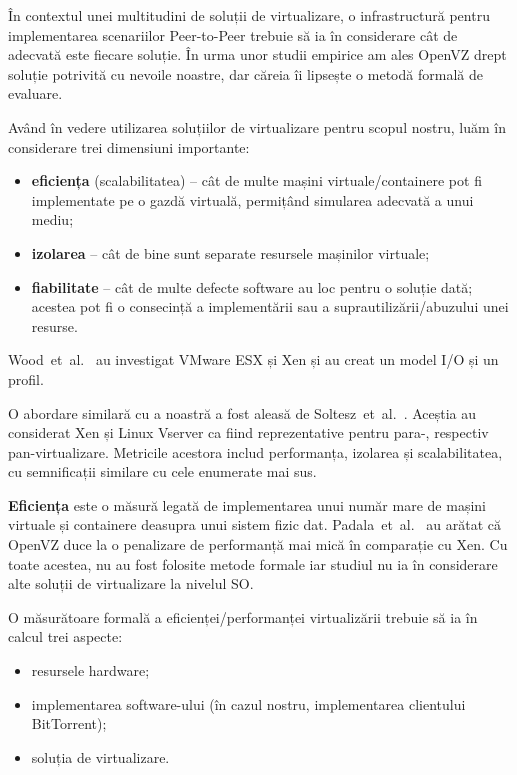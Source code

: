 În contextul unei multitudini de soluții de virtualizare, o infrastructură
pentru implementarea scenariilor Peer-to-Peer trebuie să ia în considerare
cât de adecvată este fiecare soluție. În urma unor studii empirice am ales
OpenVZ drept soluție potrivită cu nevoile noastre, dar căreia îi lipsește 
o metodă formală de evaluare.

Având în vedere utilizarea soluțiilor de virtualizare pentru scopul nostru,
luăm în considerare trei dimensiuni importante:

\begin{itemize}
  \item \textbf{eficiența} (scalabilitatea) -- cât de multe mașini
  virtuale/containere pot fi implementate pe o gazdă virtuală, permițând
  simularea adecvată a unui mediu;
  \item \textbf{izolarea} -- cât de bine sunt separate resursele mașinilor
  virtuale;
  \item \textbf{fiabilitate} -- cât de multe defecte software au loc pentru
  o soluție dată; acestea pot fi o consecință a implementării sau a
  suprautilizării/abuzului unei resurse.
\end{itemize}

Wood~et~al.~\cite{virt-prof-model} au investigat VMware ESX și Xen și au
creat un model I/O și un profil.

O abordare similară cu a noastră a fost aleasă de 
Soltesz~et~al.~\cite{virt-doppel}. Aceștia au considerat Xen și Linux
Vserver ca fiind reprezentative pentru para-, respectiv pan-virtualizare.
Metricile acestora includ performanța, izolarea și scalabilitatea, cu
semnificații similare cu cele enumerate mai sus.

\textbf{Eficiența} este o măsură legată de implementarea unui număr mare
de mașini virtuale și containere deasupra unui sistem fizic dat.
Padala~et~al.~\cite{eval-virt-performance} au arătat că OpenVZ duce la
o penalizare de performanță mai mică în comparație cu Xen. Cu toate acestea,
nu au fost folosite metode formale iar studiul nu ia în considerare alte
soluții de virtualizare la nivelul SO.

O măsurătoare formală a eficienței/performanței virtualizării trebuie să
ia în calcul trei aspecte:

\begin{itemize}
  \item resursele hardware;
  \item implementarea software-ului (în cazul nostru, implementarea
  clientului BitTorrent);
  \item soluția de virtualizare.
\end{itemize}

